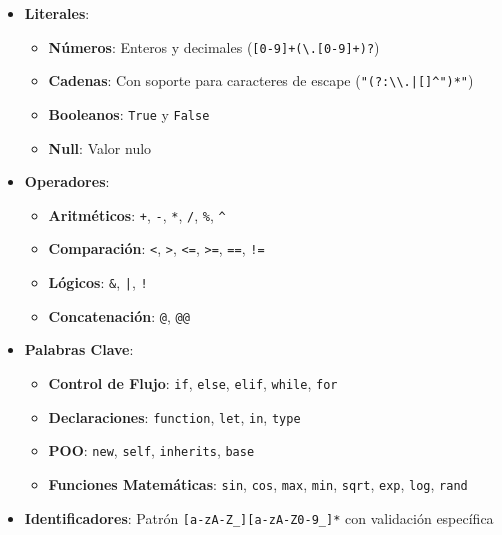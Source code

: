 \documentclass[11pt, a4paper, twoside]{article} %
\begin{document}
\begin{itemize}
    \item \textbf{Literales}:
    \begin{itemize}
        \item \textbf{Números}: Enteros y decimales (\texttt{[0-9]+(\textbackslash.[0-9]+)?})
        \item \textbf{Cadenas}: Con soporte para caracteres de escape (\texttt{"(?:\textbackslash\textbackslash.|[]\^{}")*"})
        \item \textbf{Booleanos}: \texttt{True} y \texttt{False}
        \item \textbf{Null}: Valor nulo
    \end{itemize}

    \item \textbf{Operadores}:
    \begin{itemize}
        \item \textbf{Aritméticos}: \texttt{+}, \texttt{-}, \texttt{*}, \texttt{/}, \texttt{\%}, \texttt{\textasciicircum}
        \item \textbf{Comparación}: \texttt{<}, \texttt{>}, \texttt{<=}, \texttt{>=}, \texttt{==}, \texttt{!=}
        \item \textbf{Lógicos}: \texttt{\&}, \texttt{|}, \texttt{!}
        \item \textbf{Concatenación}: \texttt{@}, \texttt{@@}
    \end{itemize}

    \item \textbf{Palabras Clave}:
    \begin{itemize}
        \item \textbf{Control de Flujo}: \texttt{if}, \texttt{else}, \texttt{elif}, \texttt{while}, \texttt{for}
        \item \textbf{Declaraciones}: \texttt{function}, \texttt{let}, \texttt{in}, \texttt{type}
        \item \textbf{POO}: \texttt{new}, \texttt{self}, \texttt{inherits}, \texttt{base}
        \item \textbf{Funciones Matemáticas}: \texttt{sin}, \texttt{cos}, \texttt{max}, \texttt{min}, \texttt{sqrt}, \texttt{exp}, \texttt{log}, \texttt{rand}
    \end{itemize}

    \item \textbf{Identificadores}: Patrón \texttt{[a-zA-Z\_][a-zA-Z0-9\_]*} con validación específica
\end{itemize}
\end{document}
